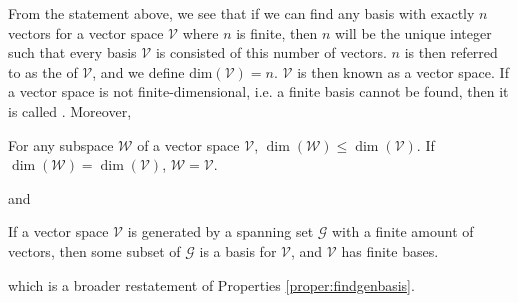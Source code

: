 From the statement above, we see that if we can find any basis with exactly $n$ vectors for a vector space $\mathcal{V}$ where $n$ is finite, then $n$ will be the unique integer such that every basis $\mathcal{V}$ is consisted of this number of vectors. $n$ is then referred to as the  of $\mathcal{V}$, and we define $\text{dim}(\mathcal{V}) = n$. $\mathcal{V}$ is then known as a  vector space. If a vector space is not finite-dimensional, i.e. a finite basis cannot be found, then it is called . Moreover,
\begin{proper}
\label{proper:dimWleqV}
For any subspace $\mathcal{W}$ of a vector space $\mathcal{V}$, $\dim(\mathcal{W}) \leq \dim(\mathcal{V})$. If $\dim(\mathcal{W}) = \dim(\mathcal{V})$, $\mathcal{W} = \mathcal{V}$.
\end{proper}
and
\begin{thm}
\label{thm:finitebasissubset}
If a vector space $\mathcal{V}$ is generated by a spanning set $\mathcal{G}$ with a finite amount of vectors, then some subset of $\mathcal{G}$ is a basis for $\mathcal{V}$, and $\mathcal{V}$ has finite bases.
\end{thm}
which is a broader restatement of Properties \ref{proper:findgenbasis}.

